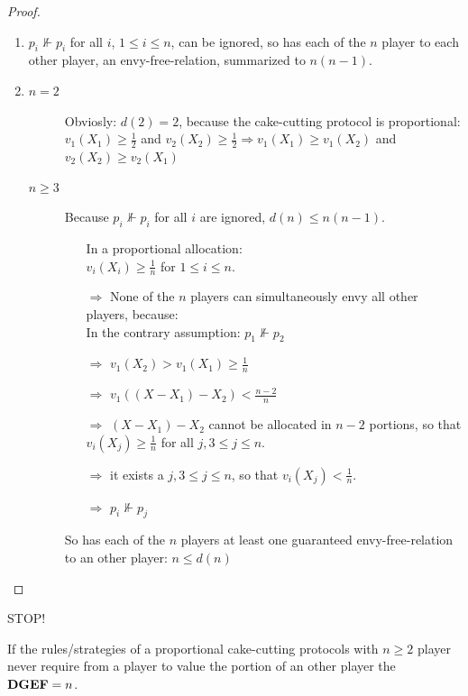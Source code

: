 \begin{proof}
 \begin{enumerate}
  \item $p_i\nVdash p_i$ for all $i$, $1\leq i\leq n$, can be ignored, so has each of the $n$ player to each other player, an envy-free-relation, summarized to $n(n-1)$.
  \item \begin{description}
         \item[$n=2$] Obviosly: $d(2)=2$, because the cake-cutting protocol is proportional: $v_1(X_1)\geq\frac{1}{2}$ and $v_2(X_2)\geq\frac{1}{2}
                    \Rightarrow v_1(X_1)\geq v_1(X_2)$ and $v_2(X_2)\geq v_2(X_1)$
         \item[$n\geq3$] Because $p_i\nVdash p_i$ for all $i$ are ignored, $d(n)\leq n(n-1)$.
                         \begin{itemize}
                          \item[] In a proportional allocation:\\$v_i(X_i)\geq\frac{1}{n}$ for $1\leq i\leq n$.\\
                          \item[$\Rightarrow$] None of the $n$ players can simultaneously envy all other players, because:\\
                                               In the contrary assumption: $p_1\nVdash p_2$
                          \item[$\Rightarrow$]$v_1(X_2)>v_1(X_1)\geq\frac{1}{n}$
                          \item[$\Rightarrow$]$v_1((X-X_1)-X_2)<\frac{n-2}{n}$
                          \item[$\Rightarrow$]$(X-X_1)-X_2$ cannot be allocated in $n-2$ portions, so that $v_i(X_j)\geq\frac{1}{n}$
                                              for all $j,3\leq j\leq n$.
                          \item[$\Rightarrow$] it exists a $j,3\leq j\leq n$, so that $v_i(X_j)<\frac{1}{n}$.
                          \item[$\Rightarrow$]$p_i\nVdash p_j$
                         \end{itemize}
                         So has each of the $n$ players at least one guaranteed envy-free-relation to an other player: $n\leq d(n)$  
        \end{description}
 \end{enumerate}
\end{proof}
STOP!
\begin{satz}
 If the rules/strategies of a proportional cake-cutting protocols with $n\geq2$ player never require from a player to value the portion of an other player the $\text{\textbf{DGEF}}=n$.
\end{satz}
